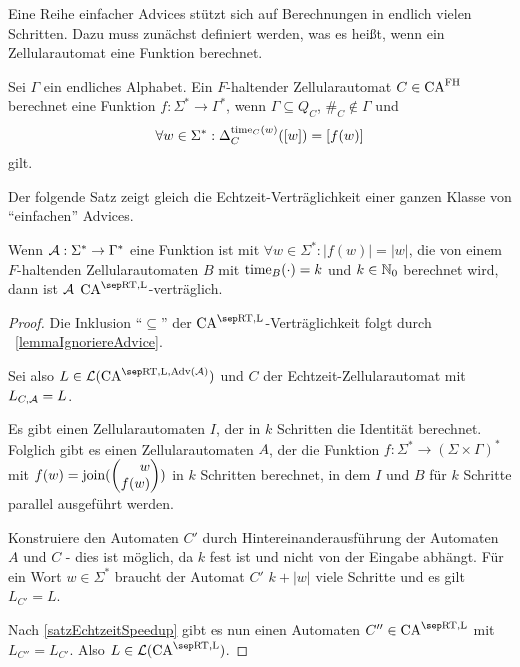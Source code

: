 Eine Reihe einfacher Advices stützt sich auf Berechnungen in endlich vielen Schritten.
Dazu muss zunächst definiert werden, was es heißt, wenn ein Zellularautomat eine Funktion berechnet.
\begin{definition}
    Sei $\Gamma$ ein endliches Alphabet.
    Ein $F$-haltender Zellularautomat $C \in \textrm{CA}^{\textrm{FH}}$ berechnet eine Funktion $f: \Sigma^* \to \Gamma^*$, wenn
    $\Gamma \subseteq Q_C$, $\#_C \not\in \Gamma$ und 
    \[
        \forall w \in \Sigma^*: \Delta^{\operatorname{time}_C(w)}_{C}([w]) = [f(w)]
    \]
    gilt.
\end{definition}

Der folgende Satz zeigt gleich die Echtzeit-Verträglichkeit einer ganzen Klasse von \enquote{einfachen} Advices.
\begin{satz}
    \label{lemmaEinfachesOrakel}
    Wenn $\mathcal{A}: \Sigma^* \to \Gamma^*$ eine Funktion ist mit $\forall w \in \Sigma^*: |f(w)| = |w|$,
    die von einem $F$-haltenden Zellularautomaten $B$ mit
    $\operatorname{time}_B(\cdot) = k$ und $k \in \mathbb{N}_0$ berechnet wird,
    dann ist $\mathcal{A}$ $\CAM{\CART, \CALeft}$-verträglich.
\end{satz}
\begin{proof}
    Die Inklusion \enquote{$\subseteq$} der $\CAM{\CART, \CALeft}$-Verträglichkeit folgt durch ~\cref{lemmaIgnoriereAdvice}.
    
    Sei also $L \in \CAL{\CART, \CALeft, \orakel({\advA})}$ und $C$
    der Echtzeit-Zellularautomat mit $L_{C, \mathcal{A}} = L$.
    
    Es gibt einen Zellularautomaten $I$, der in $k$ Schritten die Identität berechnet. Folglich gibt es einen Zellularautomaten $A$, der die Funktion $f: \Sigma^* \to (\Sigma \times \Gamma)^*$ mit
    $f(w) = \joinw(\Spvek{w; f(w)})$ in $k$ Schritten berechnet, in dem $I$ und $B$ für $k$ Schritte parallel ausgeführt werden.
    
    Konstruiere den Automaten $C'$ durch Hintereinanderausführung der Automaten $A$ und $C$ - dies ist möglich, da $k$ fest ist und nicht von der Eingabe abhängt.
    Für ein Wort $w \in \Sigma^*$ braucht der Automat $C'$ $k + |w|$ viele Schritte und es gilt $L_{C'} = L$.
    
    Nach \cref{satzEchtzeitSpeedup} gibt es nun einen Automaten $C'' \in \CAM{\CART, \CALeft}$
    mit $L_{C''} = L_{C'}$.
    Also $L \in \CAL{\CART, \CALeft}$.
\end{proof}

